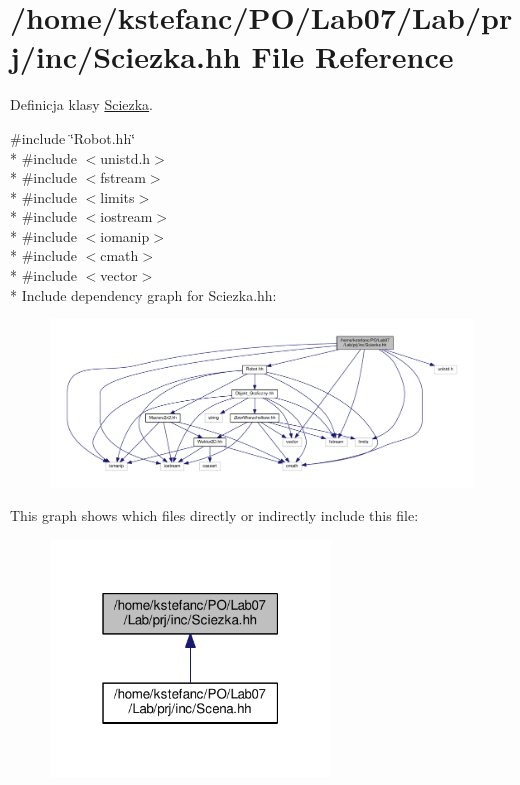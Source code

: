 \hypertarget{_sciezka_8hh}{\section{/home/kstefanc/\+P\+O/\+Lab07/\+Lab/prj/inc/\+Sciezka.hh File Reference}
\label{_sciezka_8hh}
}


Definicja klasy \hyperlink{class_sciezka}{Sciezka}.  


{\ttfamily \#include \char`\"{}Robot.\+hh\char`\"{}}\\*
{\ttfamily \#include $<$unistd.\+h$>$}\\*
{\ttfamily \#include $<$fstream$>$}\\*
{\ttfamily \#include $<$limits$>$}\\*
{\ttfamily \#include $<$iostream$>$}\\*
{\ttfamily \#include $<$iomanip$>$}\\*
{\ttfamily \#include $<$cmath$>$}\\*
{\ttfamily \#include $<$vector$>$}\\*
Include dependency graph for Sciezka.\+hh\+:\nopagebreak
\begin{figure}[H]
\begin{center}
\leavevmode
\includegraphics[width=350pt]{_sciezka_8hh__incl}
\end{center}
\end{figure}
This graph shows which files directly or indirectly include this file\+:\nopagebreak
\begin{figure}[H]
\begin{center}
\leavevmode
\includegraphics[width=211pt]{_sciezka_8hh__dep__incl}
\end{center}
\end{figure}
